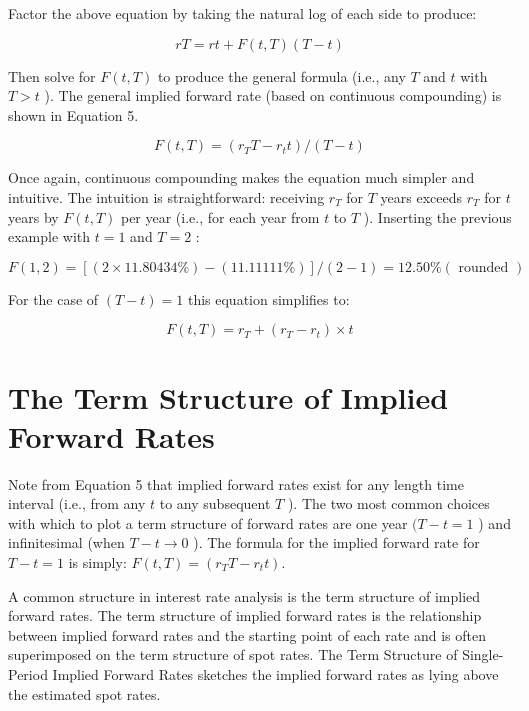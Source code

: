 \documentclass[11pt]{article}
\begin{document}
Factor the above equation by taking the natural log of each side to produce:


\begin{equation*}
r T=r t+F(t, T)(T-t) \tag{4}
\end{equation*}


Then solve for $F(t, T)$ to produce the general formula (i.e., any $T$ and $t$ with $T>t$ ). The general implied forward rate (based on continuous compounding) is shown in Equation 5.


\begin{equation*}
F(t, T)=\left(r_{T} T-r_{t} t\right) /(T-t) \tag{5}
\end{equation*}


Once again, continuous compounding makes the equation much simpler and intuitive. The intuition is straightforward: receiving $r_{T}$ for $T$ years exceeds $r_{T}$ for $t$ years by $F(t, T)$ per year (i.e., for each year from $t$ to $T$ ). Inserting the previous example with $t=1$ and $T=2$ :

$$
F(1,2)=[(2 \times 11.80434 \%)-(11.11111 \%)] /(2-1)=12.50 \%(\text { rounded })
$$

For the case of $(T-t)=1$ this equation simplifies to:


\begin{equation*}
F(t, T)=r_{T}+\left(r_{T}-r_{t}\right) \times t \tag{6}
\end{equation*}


\section*{The Term Structure of Implied Forward Rates}
Note from Equation 5 that implied forward rates exist for any length time interval (i.e., from any $t$ to any subsequent $T$ ). The two most common choices with which to plot a term structure of forward rates are one year $(T-t=1$ ) and infinitesimal (when $T-t \rightarrow 0$ ). The formula for the implied forward rate for $T-t=1$ is simply: $F(t, T)=\left(r_{T} T-r_{t} t\right)$.

A common structure in interest rate analysis is the term structure of implied forward rates. The term structure of implied forward rates is the relationship between implied forward rates and the starting point of each rate and is often superimposed on the term structure of spot rates. The Term Structure of Single-Period Implied Forward Rates sketches the implied forward rates as lying above the estimated spot rates.
\end{document}
